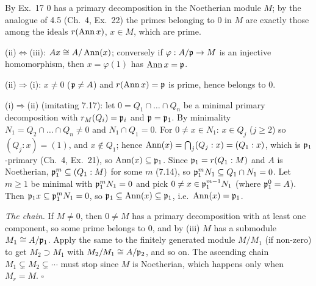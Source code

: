 \documentclass[11pt]{article}
\begin{document}
\pf
By Ex.~17 $0$ has a primary decomposition in the Noetherian module $M$; by the analogue of 4.5 (Ch.~4, Ex.~22) the primes belonging to $0$ in $M$ are exactly those among the ideals $r(\operatorname{Ann} x)$, $x\in M$, which are prime.

(ii)$\Leftrightarrow$(iii): $Ax\cong A/\operatorname{Ann}(x)$; conversely if $\varphi:A/\mathfrak p\to M$ is an injective homomorphism, then $x=\varphi(1)$ has $\operatorname{Ann} x=\mathfrak p$.

(ii)$\Rightarrow$(i): $x\ne0$ ($\mathfrak p\ne A$) and $r(\operatorname{Ann} x)=\mathfrak p$ is prime, hence belongs to $0$.

(i)$\Rightarrow$(ii) (imitating 7.17): let $0=Q_1\cap\dots\cap Q_n$ be a minimal primary decomposition with $r_M(Q_i)=\mathfrak p_i$ and $\mathfrak p=\mathfrak p_1$. By minimality $N_1=Q_2\cap\dots\cap Q_n\ne0$ and $N_1\cap Q_1=0$. For $0\ne x\in N_1$: $x\in Q_j$ ($j\ge2$) so $(Q_j:x)=(1)$, and $x\notin Q_1$; hence $\operatorname{Ann}(x)=\bigcap_j(Q_j:x)=(Q_1:x)$, which is $\mathfrak p_1$-primary (Ch.~4, Ex.~21), so $\operatorname{Ann}(x)\subseteq\mathfrak p_1$. Since $\mathfrak p_1=r(Q_1:M)$ and $A$ is Noetherian, $\mathfrak p_1^m\subseteq(Q_1:M)$ for some $m$ (7.14), so $\mathfrak p_1^mN_1\subseteq Q_1\cap N_1=0$. Let $m\ge1$ be minimal with $\mathfrak p_1^mN_1=0$ and pick $0\ne x\in\mathfrak p_1^{m-1}N_1$ (where $\mathfrak p_1^0=A$). Then $\mathfrak p_1x\subseteq\mathfrak p_1^mN_1=0$, so $\mathfrak p_1\subseteq\operatorname{Ann}(x)\subseteq\mathfrak p_1$, i.e.\ $\operatorname{Ann}(x)=\mathfrak p_1$.

\emph{The chain.} If $M\ne0$, then $0\ne M$ has a primary decomposition with at least one component, so some prime belongs to $0$, and by (iii) $M$ has a submodule $M_1\cong A/\mathfrak p_1$. Apply the same to the finitely generated module $M/M_1$ (if non-zero) to get $M_2\supset M_1$ with $M_2/M_1\cong A/\mathfrak p_2$, and so on. The ascending chain $M_1\subsetneq M_2\subsetneq\cdots$ must stop since $M$ is Noetherian, which happens only when $M_r=M$. \hfill$\square$
\end{document}
